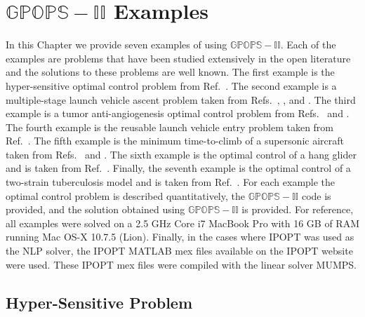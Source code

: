 \documentclass[10pt]{article}
\begin{document}
\section{$\mathbb{GPOPS-II}$ Examples}

In this Chapter we provide seven examples of using $\mathbb{GPOPS-II}$.
Each of the examples are problems that have been studied extensively
in the open literature and the solutions to these problems are well
known.  The first example is the hyper-sensitive optimal control
problem from Ref.~.  The second example is a
multiple-stage launch vehicle ascent problem taken from 
Refs.~, , and .  
The third example is a tumor anti-angiogenesis optimal control problem 
from Refs.~ and .  The fourth
example is the reusable launch vehicle entry problem taken from
Ref.~.  The fifth example is the minimum
time-to-climb of a supersonic aircraft taken from
Refs.~ and .  The sixth example is the
optimal control of a hang glider and is taken from
Ref.~.  Finally, the seventh example is the optimal
control of a two-strain tuberculosis model and is taken from
Ref.~.  For each example the optimal control problem is
described quantitatively, the $\mathbb{GPOPS-II}$ code is
provided, and the solution obtained using $\mathbb{GPOPS-II}$
is provided.   For reference, all examples were solved on a 2.5 GHz
Core i7 MacBook Pro with 16 GB of RAM running Mac OS-X 10.7.5 (Lion).
Finally, in the cases where IPOPT was used as the NLP solver, the
IPOPT MATLAB mex files available on the IPOPT website were used.
These IPOPT mex files were compiled with the linear solver MUMPS.  

\subsection{Hyper-Sensitive Problem}
\end{document}
